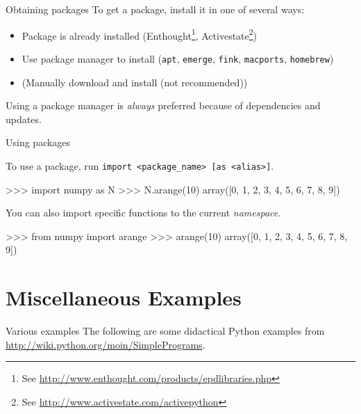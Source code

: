 \documentclass[xetex,10pt]{beamer}
\def\pythoni{\lstinline[language=pythontim]}
\def\spacer{\vspace*{1em}}
\begin{document}
\begin{frame}[fragile]{Obtaining packages}
	To get a package, install it in one of several ways:
	
	\spacer
	
	\begin{itemize}
		\item Package is already installed (Enthought\footnote[frame]{See \url{http://www.enthought.com/products/epdlibraries.php}}, Activestate\footnote[frame]{See \url{http://www.activestate.com/activepython}})
		\pause
		\item Use package manager to install (\texttt{apt}, \texttt{emerge}, \texttt{fink}, \texttt{macports}, \texttt{homebrew})
		\pause
		\item (Manually download and install (not recommended))
	\end{itemize}
	
	\spacer
	\pause
	
	Using a package manager is \emph{always} preferred because of dependencies and updates.
\end{frame}

\begin{frame}[fragile]{Using packages}
	
	To use a package, run \pythoni{import}\verb! <package_name> [as <alias>]!.
	\spacer
\begin{python}
>>> import numpy as N
>>> N.arange(10)
array([0, 1, 2, 3, 4, 5, 6, 7, 8, 9])
\end{python}
	\spacer
	\pause
	You can also import specific functions to the current \emph{namespace}.
	\spacer
\begin{python}
>>> from numpy import arange
>>> arange(10)
array([0, 1, 2, 3, 4, 5, 6, 7, 8, 9])
\end{python}

\end{frame}

\section{Miscellaneous Examples}

\begin{frame}[fragile]{Various examples}
	The following are some didactical Python examples from \url{http://wiki.python.org/moin/SimplePrograms}.
\end{frame}
\end{document}

